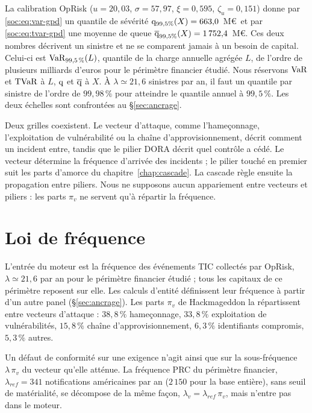 \noindent La calibration OpRisk ($u=20{,}03$, $\sigma=57{,}97$, $\xi=0{,}595$, $\zeta_u=0{,}151$)
donne par \eqref{soc:eq:var-gpd} un quantile de sévérité $\mathrm{q}_{99{,}5\%}(X)=663{,}0$~M\euro\ et
par \eqref{soc:eq:tvar-gpd} une moyenne de queue $\overline{\mathrm{q}}_{99{,}5\%}(X)=1\,752{,}4$~M\euro. Ces
deux nombres décrivent un sinistre et ne se comparent jamais à un besoin de capital. Celui-ci est
$\mathrm{VaR}_{99{,}5\,\%}(L)$, quantile de la charge annuelle agrégée $L$, de l'ordre de plusieurs milliards
d'euros pour le périmètre financier étudié. Nous réservons $\mathrm{VaR}$ et $\mathrm{TVaR}$ à $L$,
$\mathrm{q}$ et $\overline{\mathrm{q}}$ à $X$. À $\lambda\simeq21{,}6$ sinistres par an, il faut un quantile
par sinistre de l'ordre de $99{,}98\,\%$ pour atteindre le quantile annuel à $99{,}5\,\%$. Les deux
échelles sont confrontées au \S\ref{sec:ancrage}.

Deux grilles coexistent. Le vecteur d'attaque, comme l'hameçonnage, l'exploitation de
vulnérabilité ou la chaîne d'approvisionnement, décrit comment un incident entre, tandis que le
pilier DORA décrit quel contrôle a cédé. Le vecteur détermine la fréquence d'arrivée des incidents ; le pilier touché en premier suit les parts d'amorce du chapitre~\ref{chap:cascade}. La cascade règle ensuite la propagation entre piliers. Nous ne
supposons aucun appariement entre vecteurs et piliers : les parts $\pi_v$ ne servent qu'à répartir
la fréquence.

\section{Loi de fréquence}

L'entrée du moteur est la fréquence des événements TIC collectés par OpRisk, $\lambda \simeq 21{,}6$
par an pour le périmètre financier étudié ; tous les capitaux de ce périmètre reposent sur elle. Les
calculs d'entité définissent leur fréquence à partir d'un autre panel (\S\ref{sec:ancrage}). Les parts $\pi_v$ de Hackmageddon la répartissent entre vecteurs d'attaque :
$38{,}8\,\%$ hameçonnage, $33{,}8\,\%$ exploitation de vulnérabilités, $15{,}8\,\%$ chaîne
d'approvisionnement, $6{,}3\,\%$ identifiants compromis, $5{,}3\,\%$ autres.

Un défaut de conformité
sur une exigence n'agit ainsi que sur la sous-fréquence $\lambda\,\pi_v$ du vecteur qu'elle atténue.
La fréquence PRC du périmètre financier, $\lambda_{ref} = 341$ notifications américaines par an
($2\,150$ pour la base entière), sans seuil de matérialité, se décompose de la même façon,
$\lambda_v = \lambda_{ref}\,\pi_v$, mais n'entre pas dans le moteur.

